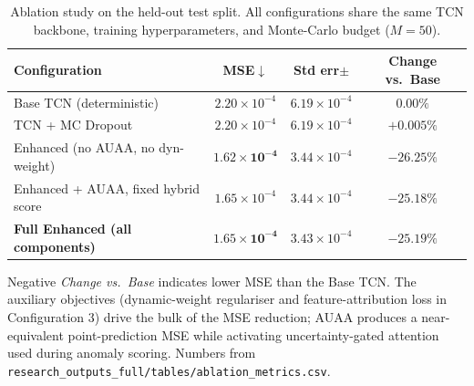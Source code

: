 \begin{table}[htbp]
\centering
\caption{Ablation study on the held-out test split. All configurations share the same TCN backbone, training hyperparameters, and Monte-Carlo budget ($M=50$).}
\label{table:ablation_results}
\begin{tabular}{lccc}
\toprule
\textbf{Configuration} & \textbf{MSE}$\downarrow$ & \textbf{Std err}$\pm$ & \textbf{Change vs.\ Base} \\
\midrule
Base TCN (deterministic)            & $2.20\times 10^{-4}$           & $6.19\times 10^{-4}$ & $0.00\%$ \\
TCN + MC Dropout                    & $2.20\times 10^{-4}$           & $6.19\times 10^{-4}$ & $+0.005\%$ \\
Enhanced (no AUAA, no dyn-weight)   & $\mathbf{1.62\times 10^{-4}}$  & $3.44\times 10^{-4}$ & $\mathbf{-26.25\%}$ \\
Enhanced + AUAA, fixed hybrid score & $1.65\times 10^{-4}$           & $3.44\times 10^{-4}$ & $-25.18\%$ \\
\textbf{Full Enhanced (all components)} & $\mathbf{1.65\times 10^{-4}}$ & $3.43\times 10^{-4}$ & $\mathbf{-25.19\%}$ \\
\bottomrule
\end{tabular}
\begin{flushleft}
\footnotesize Negative \textit{Change vs.\ Base} indicates lower MSE than the Base TCN. The auxiliary objectives (dynamic-weight regulariser and feature-attribution loss in Configuration 3) drive the bulk of the MSE reduction; AUAA produces a near-equivalent point-prediction MSE while activating uncertainty-gated attention used during anomaly scoring. Numbers from \texttt{research\_outputs\_full/tables/ablation\_metrics.csv}.
\end{flushleft}
\end{table}
